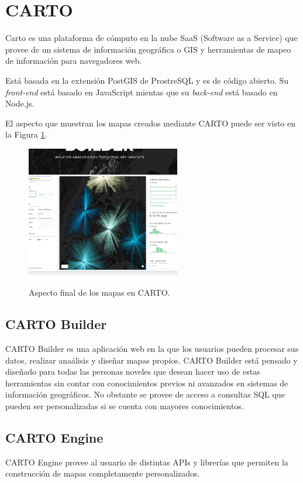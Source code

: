 \section{CARTO}
Carto es una plataforma de cómputo en la nube SaaS (Software as a Service) que provee de un sistema de información geográfica o GIS y herramientas de mapeo de información para navegadores web.

Está basada en la extensión PostGIS de ProstreSQL y es de código abierto. Su \textit{front-end} está basado en JavaScript mientas que su \textit{back-end} está basado en Node.js.

El aspecto que muestran los mapas creados mediante CARTO puede ser visto en la Figura \ref{carto}.

\begin{figure}[h]
  \centering
    \includegraphics[width=0.6\textwidth]{../img/weka/carto.jpg}
  \caption{Aspecto final de los mapas en CARTO.}
  \label{carto}
\end{figure}


\subsection{CARTO Builder}
CARTO Builder es una aplicación web en la que los usuarios pueden procesar sus datos, realizar anaálisis y diseñar mapas propios. CARTO Builder está pensado y diseñado para todas las personas noveles que desean hacer uso de estas herramientas sin contar con conocimientos previos ni avanzados en sistemas de información geográficos. No obstante se provee de acceso a consultas SQL que pueden ser personalizadas si se cuenta con mayores conocimientos.

\subsection{CARTO Engine}
CARTO Engine provee al usuario de distintas APIs y librerías que permiten la construcción de mapas completamente personalizados.

